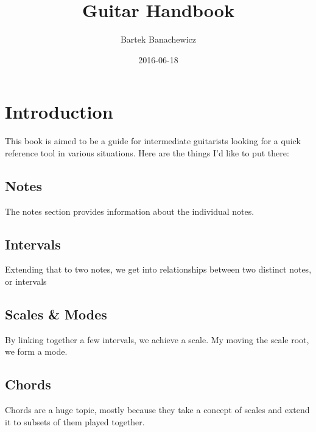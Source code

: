 \documentclass{article}
\title{Guitar Handbook}
\date{2016-06-18}
\author{Bartek Banachewicz}
\begin{document}
\maketitle
\newpage

\section{Introduction}
\noindent
This book is aimed to be a guide for intermediate guitarists looking for a quick reference tool in various situations.
Here are the things I'd like to put there:

\subsection{Notes}
The notes section provides information about the individual notes.
\subsection{Intervals}
Extending that to two notes, we get into relationships between two distinct notes, or intervals
\subsection{Scales \& Modes}
By linking together a few intervals, we achieve a scale. My moving the scale root, we form a mode.
\subsection{Chords}
Chords are a huge topic, mostly because they take a concept of scales and extend it to subsets of them played together.



\end{document}
